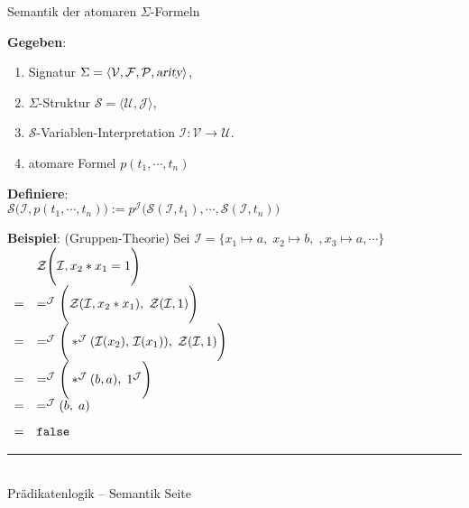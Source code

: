\documentclass{slides}
\newcommand{\myrule}{\rule{20cm}{1mm}\\ }
\newcommand{\struct}{\mathcal{S}}
\newcounter{mypage}
\begin{document}

\begin{slide}{}
\normalsize
\begin{center}
Semantik der atomaren $\Sigma$-Formeln
\end{center}
\vspace{0.5cm}

\footnotesize
\textbf{Gegeben}: 
\begin{enumerate}
\item Signatur $\Sigma = \langle \mathcal{V}, \mathcal{F}, \mathcal{P}, \textsl{arity} \rangle$,
\item $\Sigma$-Struktur $\struct = \langle \mathcal{U}, \mathcal{J} \rangle$,
\item $\struct$-Variablen-Interpretation $\mathcal{I}: \mathcal{V} \rightarrow \mathcal{U}$.
\item atomare Formel $p(t_1, \cdots, t_n)$
\end{enumerate}
\textbf{Definiere}: \\[0.1cm]
\hspace*{1.3cm} $\struct\Bigg(\mathcal{I}, p(t_1,\cdots,t_n)\Bigg) := 
                 p^\mathcal{J}\Bigg( \struct(\mathcal{I}, t_1), \cdots, \struct(\mathcal{I}, t_n) \Bigg)$

\textbf{Beispiel}: (Gruppen-Theorie) 
Sei $\mathcal{I} = \{ x_1 \mapsto a, \; x_2 \mapsto b, \;, x_3 \mapsto a, \cdots \}$ \\[0.3cm]

\hspace*{2.0cm} 
 $
 \begin{array}[c]{cl}
  &  \mathcal{Z}\Bigg( \mathcal{I}, x_2 * x_1 = 1 \Bigg) \\[0.3cm]
= &  =^\mathcal{J}\Bigg(\mathcal{Z}(\mathcal{I}, x_2 * x_1),\;\mathcal{Z}(\mathcal{I},1)\Bigg) \\[0.3cm]
= &  =^\mathcal{J}\Bigg(*^\mathcal{J}(\mathcal{I}(x_2),\, \mathcal{I}(x_1)),\;\mathcal{Z}(\mathcal{I},1)\Bigg) \\[0.3cm]
= &  =^\mathcal{J}\Bigg(*^\mathcal{J}(b, a),\;1^\mathcal{J}\Bigg) \\[0.3cm]
= &  =^\mathcal{J}( b,\; a) \\[0.3cm]
= &  \mathtt{false} 
 \end{array}
$

\vspace*{\fill}
\tiny \addtocounter{mypage}{1}
\myrule
Pr\"{a}dikatenlogik -- Semantik  \hspace*{\fill} Seite 
\end{slide}
\end{document}
